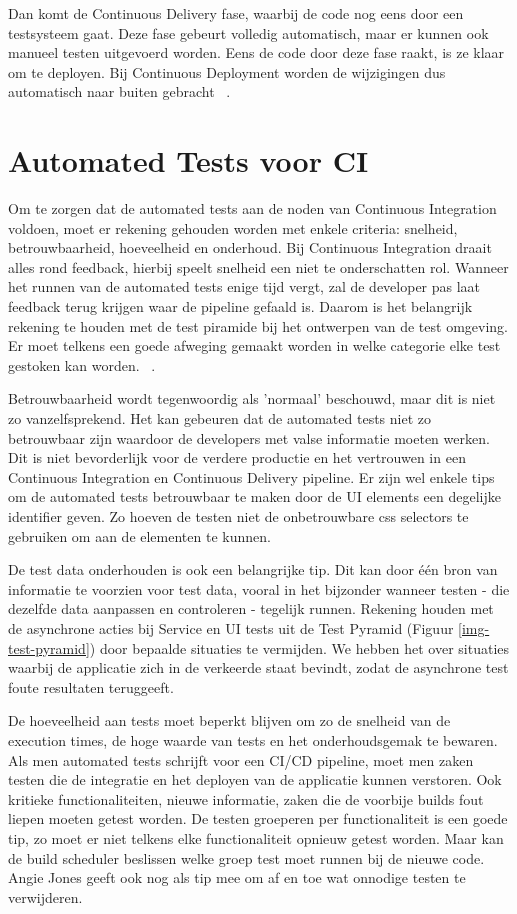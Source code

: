 Dan komt de Continuous Delivery fase, waarbij de code nog eens door een testsysteem gaat. Deze fase gebeurt volledig automatisch, maar er kunnen ook manueel testen uitgevoerd worden. Eens de code door deze fase raakt, is ze klaar om te deployen. 
Bij Continuous Deployment worden de wijzigingen dus automatisch naar buiten gebracht ~\autocite{Kramer2018}.

\section{Automated Tests voor CI}
\label{sec:automated-test-voor-ci}
Om te zorgen dat de automated tests aan de noden van Continuous Integration voldoen, moet er rekening gehouden worden met enkele criteria: snelheid, betrouwbaarheid, hoeveelheid en onderhoud.
Bij Continuous Integration draait alles rond feedback, hierbij speelt snelheid een niet te onderschatten rol. Wanneer het runnen van de automated tests enige tijd vergt, zal de developer pas laat feedback terug krijgen waar de pipeline gefaald is. Daarom is het belangrijk rekening te houden met de test piramide bij het ontwerpen van de test omgeving. Er moet telkens een goede afweging gemaakt worden in welke categorie elke test gestoken kan worden.
~\autocite{Jones2019}.

Betrouwbaarheid wordt tegenwoordig als 'normaal' beschouwd, maar dit is niet zo vanzelfsprekend. Het kan gebeuren dat de automated tests niet zo betrouwbaar zijn waardoor de developers met valse informatie moeten werken. Dit is niet bevorderlijk voor de verdere productie en het vertrouwen in een Continuous Integration en Continuous Delivery pipeline. Er zijn wel enkele tips om de automated tests betrouwbaar te maken door de UI elements een degelijke identifier geven. Zo hoeven de testen niet de onbetrouwbare css selectors te gebruiken om aan de elementen te kunnen. 

De test data onderhouden is ook een belangrijke tip. Dit kan door één bron van informatie te voorzien voor test data, vooral in het bijzonder wanneer testen - die dezelfde data aanpassen en controleren - tegelijk runnen. Rekening houden met de asynchrone acties bij Service en UI tests uit de Test Pyramid (Figuur \ref{img-test-pyramid}) door bepaalde situaties te vermijden. We hebben het over situaties waarbij de applicatie zich in de verkeerde staat bevindt, zodat de asynchrone test foute resultaten teruggeeft.

De hoeveelheid aan tests moet beperkt blijven om zo de snelheid van de execution times, de hoge waarde van tests en het onderhoudsgemak te bewaren.
Als men automated tests schrijft voor een CI/CD pipeline, moet men zaken testen die de integratie en het deployen van de applicatie kunnen verstoren.
Ook kritieke functionaliteiten, nieuwe informatie, zaken die de voorbije builds fout liepen moeten getest worden. 
De testen groeperen per functionaliteit is een goede tip, zo moet er niet telkens elke functionaliteit opnieuw getest worden. Maar kan de build scheduler beslissen welke groep test moet runnen bij de nieuwe code. 
Angie Jones \textcite{Jones2019} geeft ook nog als tip mee om af en toe wat onnodige testen te verwijderen.

